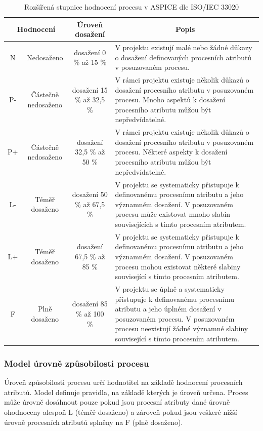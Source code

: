 \documentclass[czech,master,public,dept460,male,cpdeclaration,oneside]{diploma}
\begin{document}
\begin{table}[htp]
\begin{center}
\begin{tabular}{c | c | c | m{6cm}}
\multicolumn{2}{c|}{\textbf{Hodnocení}} & \multicolumn{1}{c|}{\textbf{Úroveň dosažení}} & \multicolumn{1}{c}{\textbf{Popis}} \\ 
\hline
\hline
N  & Nedosaženo & dosažení 0 \% až 15 \% & V projektu existují malé nebo žádné důkazy o dosažení definovaných procesních atributů v posuzovaném procesu. \\ 
\hline
P- & Částečně nedosaženo & dosažení 15 \% až  32,5 \% & V rámci projektu existuje několik důkazů o dosažení procesního atributu v posuzovaném procesu. Mnoho aspektů k dosažení procesního atributu můžou být nepředvídatelné. \\ 
\hline
P+ & Částečně nedosaženo & dosažení  32,5 \% až 50 \% & V rámci projektu existuje několik důkazů o dosažení procesního atributu v posuzovaném procesu. Některé aspekty k dosažení procesního atributu můžou být nepředvídatelné. \\ 
\hline
L- & Téměř dosaženo & dosažení  50 \% až 67,5 \% & V projektu se systematicky přistupuje k  definovanému procesnímu atributu a jeho významném dosažení. V posuzovaném procesu může existovat mnoho slabin souvisejících s tímto procesním atributem. \\ 
\hline
L+ & Téměř dosaženo  & dosažení  67,5 \% až 85 \% & V projektu se systematicky přistupuje k definovanému procesnímu atributu a jeho významném dosažení. V posuzovaném procesu mohou existovat některé slabiny související s tímto procesním atributem. \\ 
\hline
F  & Plně dosaženo & dosažení  85 \% až 100 \% & V projektu se úplně a systematicky přistupuje k definovanému procesnímu atributu a jeho úplném dosažení v posuzovaném procesu. V posuzovaném procesu neexistují žádné významné slabiny související s tímto procesním atributem. \\ 
\end{tabular}
\caption{Rozšířená stupnice hodnocení procesu v ASPICE dle ISO/IEC 33020 \cite{ref:aspice_download_1523}}
\label{tab:aspice_rating_scale}
\end{center}
\end{table}

\subsubsection{Model úrovně způsobilosti procesu}
Úroveň způsobilosti procesu určí hodnotitel na základě hodnocení procesních atributů. Model definuje  pravidla, na základě kterých je úroveň určena. Proces může úrovně dosáhnout pouze pokud jsou procesní atributy dané úrovně ohodnoceny alespoň L (téměř dosaženo) a zároveň pokud jsou veškeré nižší úrovně procesních atributů splněny na F (plně dosaženo).
\end{document}
